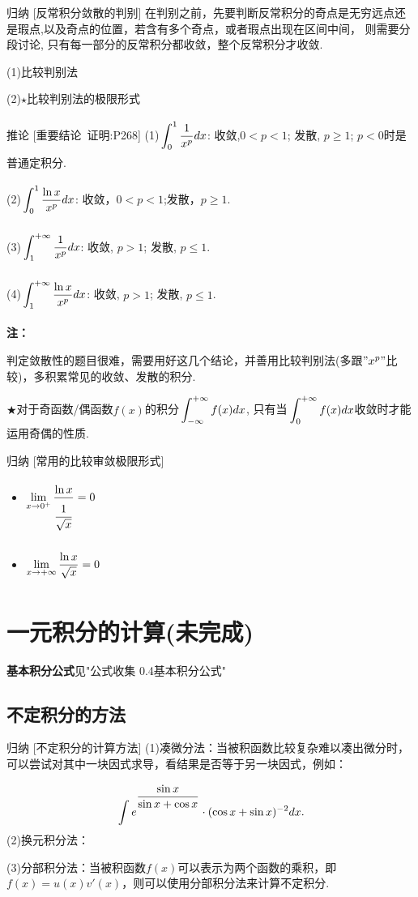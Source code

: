 \documentclass[a4paper,12pt,oneside,fontset=none]{ctexbook}
\renewcommand{\ge}{\geqslant}
\renewcommand{\geq}{\geqslant}
\renewcommand{\le}{\leqslant}
\let\olddfrac\dfrac
\renewcommand{\dfrac}[2]{
    \olddfrac{#1\vrule width 0pt height 1.15em depth 0em}{#2\vrule width 0pt height 0em depth 0.6em}
}
\let\oldlim\lim
\renewcommand{\lim}{\displaystyle\oldlim}
\let\oldint\int
\renewcommand{\int}{\displaystyle{\vrule width 0pt height 0em depth 0em}\oldint}
\newenvironment{corollary}[1][]{\begin{thmBox}{推论}{#1}}{\end{thmBox}}
\newenvironment{induction}[1][]{\begin{thmBox}{归纳}{#1}}{\end{thmBox}}
\newenvironment{note}{
    \par\vspace{0.5em}\noindent
    \textbf{\color{NoteColor} 注：}
}{
    \par\vspace{0.5em}
}
\numberwithin{equation}{chapter}
\begin{document}
\begin{induction}
    [反常积分敛散的判别]
    在判别之前，先要判断反常积分的奇点是无穷远点还是瑕点,以及奇点的位置，若含有多个奇点，或者瑕点出现在区间中间，
    则需要分段讨论, 只有每一部分的反常积分都收敛，整个反常积分才收敛.

    (1)比较判别法
    
    (2)$\star$比较判别法的极限形式
\end{induction}
\begin{corollary}
    [重要结论\ 证明:P268]
    (1)$\int_0^1\dfrac{1}{x^p} dx$: 收敛,$0<p<1$; 发散, $p \ge 1$; $p<0$时是普通定积分.

    (2)$\int_0^1 \dfrac{\ln x}{x^p}dx$: 收敛，$0<p<1$;发散，$p\geq 1$.

    (3)$\int_1^{+\infty}\dfrac{1}{x^p} dx$: 收敛, $p>1$; 发散, $p \le 1$.

    (4)$\int_1^{+\infty}\dfrac{\ln x}{x^p}dx$: 收敛, $p>1$; 发散, $p \le 1$.
\end{corollary}
\begin{note}
    判定敛散性的题目很难，需要用好这几个结论，并善用比较判别法(多跟$"x^p"$比较)，多积累常见的收敛、发散的积分.

    $\bigstar$对于奇函数/偶函数$f(x)$的积分$\int_{-\infty}^{+\infty}f(x)dx$,
    只有当$\int_{0}^{+\infty}f(x)dx$收敛时才能运用奇偶的性质.
\end{note}

\begin{induction}
    [常用的比较审敛极限形式]
    \begin{itemize}
        \item $\lim_{x\to 0^+}\dfrac{\ln x}{\dfrac{1}{\sqrt{x}}} = 0$
        \item $\lim_{x\to +\infty}\dfrac{\ln x}{\sqrt{x}} = 0$
    \end{itemize}
\end{induction}



\chapter{一元积分的计算(未完成)}
\textbf{基本积分公式}见"公式收集 0.4基本积分公式"

\section{不定积分的方法}
\begin{induction}
    [不定积分的计算方法]
    (1)凑微分法：当被积函数比较复杂难以凑出微分时，可以尝试对其中一块因式求导，看结果是否等于另一块因式，例如：
    \[
        \int e^{\dfrac{\sin x}{\sin x + \cos x}}\cdot (\cos x + \sin x)^{-2} dx.
    \]
    (2)换元积分法：

    (3)分部积分法：当被积函数$f(x)$可以表示为两个函数的乘积，即$f(x) = u(x)v'(x)$，则可以使用分部积分法来计算不定积分.



\end{induction}
\end{document}
